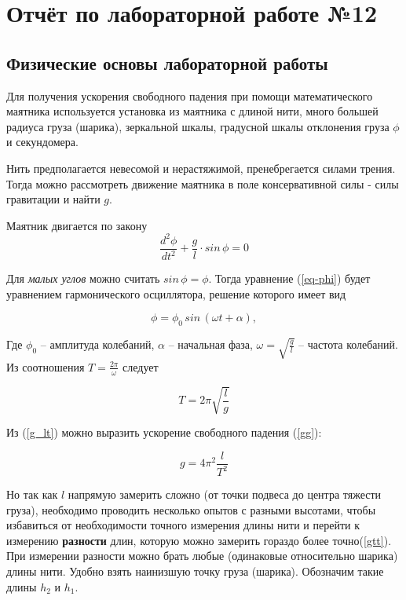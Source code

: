 \documentclass[a4paper,12pt]{article}
\begin{document}

\section{Отчёт по лабораторной работе №12}

\subsection{Физические основы лабораторной работы}

Для получения ускорения свободного падения при помощи математического маятника используется установка из маятника с длиной нити, много большей радиуса груза (шарика), зеркальной шкалы,  градусной шкалы отклонения груза $\phi$ и секундомера.

Нить предполагается невесомой и нерастяжимой, пренебрегается силами трения. Тогда можно рассмотреть движение маятника в поле консервативной силы - силы гравитации и найти ${g}$.

Маятник двигается по закону 
\begin{equation}
	\label{eq-phi}
	\frac{d^2\phi}{dt^2}+\frac{g}{l}\cdot{}sin\,\phi=0
\end{equation}

Для \textit{малых углов} можно считать $sin\,\phi=\phi$. Тогда уравнение (\ref{eq-phi}) будет уравнением гармонического осциллятора, решение которого имеет вид 

\begin{equation}
	\label{eq-garm}
	\phi=\phi_0\,sin\,(\omega{}t+\alpha),
\end{equation}

Где $\phi_0$ -- амплитуда колебаний, $\alpha$ -- начальная фаза, $\omega=\sqrt{\frac{g}{l}}$ -- частота колебаний. Из соотношения $T=\frac{2\pi}{\omega}$ следует

\begin{equation}
	\label{g_lt}
	T=2\pi\sqrt{\frac{l}{g}}
\end{equation}

Из (\ref{g_lt}) можно выразить ускорение свободного падения (\ref{gg}):

\begin{equation}
\label{gg}
	g=4\pi^2\frac{l}{T^2}
\end{equation}

Но так как $l$ напрямую замерить сложно (от точки подвеса до центра тяжести груза), необходимо проводить несколько опытов с разными высотами, чтобы избавиться от необходимости точного измерения длины нити и перейти к измерению \textbf{разности} длин, которую можно замерить гораздо более точно(\ref{gtt}). При измерении разности можно брать любые (одинаковые относительно шарика) длины нити. Удобно взять наинизшую точку груза (шарика). Обозначим такие длины $h_2$ и $h_1$.
\end{document}
